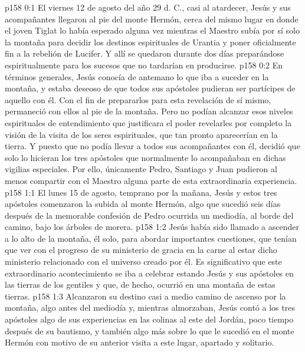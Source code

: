 \author{Comisión de seres intermedios}
\vs p158 0:1 El viernes 12 de agosto del año 29 d. C., casi al atardecer, Jesús y sus acompañantes llegaron al pie del monte Hermón, cerca del mismo lugar en donde el joven Tiglat lo había esperado alguna vez mientras el Maestro subía por sí solo la montaña para decidir los destinos espirituales de Urantia y poner oficialmente fin a la rebelión de Lucifer. Y allí se quedaron durante dos días preparándose espiritualmente para los sucesos que no tardarían en producirse.
\vs p158 0:2 En términos generales, Jesús conocía de antemano lo que iba a suceder en la montaña, y estaba deseoso de que todos sus apóstoles pudieran ser partícipes de aquello con él. Con el fin de prepararlos para esta revelación de sí mismo, permaneció con ellos al pie de la montaña. Pero no podían alcanzar esos niveles espirituales de entendimiento que justificara el poder revelarles por completo la visión de la visita de los seres espirituales, que tan pronto aparecerían en la tierra. Y puesto que no podía llevar a todos sus acompañantes con él, decidió que solo lo hicieran los tres apóstoles que normalmente lo acompañaban en dichas vigilias especiales. Por ello, únicamente Pedro, Santiago y Juan pudieron al menos compartir con el Maestro alguna parte de esta extraordinaria experiencia.
\vs p158 1:1 El lunes 15 de agosto, temprano por la mañana, Jesús y estos tres apóstoles comenzaron la subida al monte Hermón, algo que sucedió seis días después de la memorable confesión de Pedro ocurrida un mediodía, al borde del camino, bajo los árboles de morera.
\vs p158 1:2 Jesús había sido llamado a ascender a lo alto de la montaña, él solo, para abordar importantes cuestiones, que tenían que ver con el progreso de su ministerio de gracia en la carne al estar dicho ministerio relacionado con el universo creado por él. Es significativo que este extraordinario acontecimiento se iba a celebrar estando Jesús y sus apóstoles en las tierras de los gentiles y que, de hecho, ocurrió en una montaña de estas tierras.
\vs p158 1:3 Alcanzaron su destino casi a medio camino de ascenso por la montaña, algo antes del mediodía y, mientras almorzaban, Jesús contó a los tres apóstoles algo de sus experiencias en las colinas al este del Jordán, poco tiempo después de su bautismo, y también algo más sobre lo que le sucedió en el monte Hermón con motivo de su anterior visita a este lugar, apartado y solitario.
